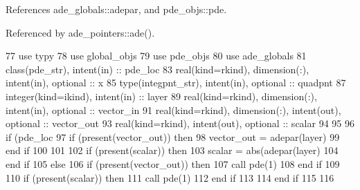 References ade\+\_\+globals\+::adepar, and pde\+\_\+objs\+::pde.



Referenced by ade\+\_\+pointers\+::ade().


\begin{DoxyCode}
77       \textcolor{keywordtype}{use }typy
78       \textcolor{keywordtype}{use }global_objs
79       \textcolor{keywordtype}{use }pde_objs
80       \textcolor{keywordtype}{use }ade_globals
81       \textcolor{keywordtype}{class}(pde_str), \textcolor{keywordtype}{intent(in)} :: pde\_loc
83       \textcolor{keywordtype}{real(kind=rkind)}, \textcolor{keywordtype}{dimension(:)}, \textcolor{keywordtype}{intent(in)}, \textcolor{keywordtype}{optional}    :: x
85       \textcolor{keywordtype}{type}(integpnt_str), \textcolor{keywordtype}{intent(in)}, \textcolor{keywordtype}{optional} :: quadpnt
87       \textcolor{keywordtype}{integer(kind=ikind)}, \textcolor{keywordtype}{intent(in)} :: layer
89       \textcolor{keywordtype}{real(kind=rkind)}, \textcolor{keywordtype}{dimension(:)}, \textcolor{keywordtype}{intent(in)}, \textcolor{keywordtype}{optional}  :: vector\_in
91       \textcolor{keywordtype}{real(kind=rkind)}, \textcolor{keywordtype}{dimension(:)}, \textcolor{keywordtype}{intent(out)}, \textcolor{keywordtype}{optional} :: vector\_out
93       \textcolor{keywordtype}{real(kind=rkind)}, \textcolor{keywordtype}{intent(out)}, \textcolor{keywordtype}{optional}               :: scalar
94       
95       
96       \textcolor{keywordflow}{if} (pde\_loc%
97         \textcolor{keywordflow}{if} (\textcolor{keyword}{present}(vector\_out)) \textcolor{keywordflow}{then}
98           vector\_out = adepar(layer)%
99 \textcolor{keywordflow}{        end if}
100         
101         
102         \textcolor{keywordflow}{if} (\textcolor{keyword}{present}(scalar)) \textcolor{keywordflow}{then}
103           scalar = abs(adepar(layer)%
104 \textcolor{keywordflow}{        end if}
105       \textcolor{keywordflow}{else}
106         \textcolor{keywordflow}{if} (\textcolor{keyword}{present}(vector\_out)) \textcolor{keywordflow}{then}
107           \textcolor{keyword}{call }pde(1)%
108 \textcolor{keywordflow}{        end if}
109         
110         \textcolor{keywordflow}{if} (\textcolor{keyword}{present}(scalar)) \textcolor{keywordflow}{then}
111           \textcolor{keyword}{call }pde(1)%
112 \textcolor{keywordflow}{        end if}
113         
114 \textcolor{keywordflow}{      end if}
115       
116       
\end{DoxyCode}


